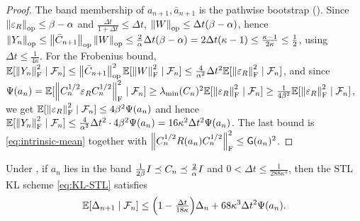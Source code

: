 \begin{proof}
The band membership of $a_{n+1},\bar a_{n+1}$ is the pathwise bootstrap
(). Since $\left\lVert \varepsilon_R\right\rVert_{\mathrm{op}}\leq\beta-\alpha$ and
$\tfrac{\Delta t}{1+\Delta t}\leq\Delta t$, $\left\lVert W\right\rVert_{\mathrm{op}}\leq\Delta t(\beta-\alpha)$, hence
$\left\lVert Y_n\right\rVert_{\mathrm{op}}\leq\left\lVert \bar C_{n+1}\right\rVert_{\mathrm{op}}\left\lVert W\right\rVert_{\mathrm{op}}\leq\tfrac2\alpha\Delta t(\beta-\alpha)=2\Delta t(\kappa-1)\leq\tfrac{\kappa-1}{2\kappa}\leq\tfrac12$,
using $\Delta t\leq\tfrac1{4\kappa}$. For the Frobenius bound,
$\mathbb{E}[\left\lVert Y_n\right\rVert_{\mathrm{F}}^2\mid\mathcal{F}_n]\leq\left\lVert \bar C_{n+1}\right\rVert_{\mathrm{op}}^2\mathbb{E}[\left\lVert W\right\rVert_{\mathrm{F}}^2\mid\mathcal{F}_n]\leq\tfrac4{\alpha^2}\Delta t^2\mathbb{E}[\left\lVert \varepsilon_R\right\rVert_{\mathrm{F}}^2\mid\mathcal{F}_n]$,
and since $\Psi(a_n)=\mathbb{E}[\left\lVert C_n^{1/2}\varepsilon_RC_n^{1/2}\right\rVert_{\mathrm{F}}^2\mid\mathcal{F}_n]\geq\lambda_{\min}(C_n)^2\mathbb{E}[\left\lVert \varepsilon_R\right\rVert_{\mathrm{F}}^2\mid\mathcal{F}_n]\geq\tfrac1{4\beta^2}\mathbb{E}[\left\lVert \varepsilon_R\right\rVert_{\mathrm{F}}^2\mid\mathcal{F}_n]$,
we get $\mathbb{E}[\left\lVert \varepsilon_R\right\rVert_{\mathrm{F}}^2\mid\mathcal{F}_n]\leq4\beta^2\Psi(a_n)$ and hence
$\mathbb{E}[\left\lVert Y_n\right\rVert_{\mathrm{F}}^2\mid\mathcal{F}_n]\leq\tfrac4{\alpha^2}\Delta t^2\cdot4\beta^2\Psi(a_n)=16\kappa^2\Delta t^2\Psi(a_n)$.
The last bound is \eqref{eq:intrinsic-mean} together with
$\left\lVert C_n^{1/2}R(a_n)C_n^{1/2}\right\rVert_{\mathrm{F}}^2\leq\mathsf{G}(a_n)^2$.
\end{proof}

\begin{lemma}
\label{lem:KL-STL-descent}
Under , if $a_n$ lies in the band
$\tfrac1{2\beta}I\preceq C_n\preceq\tfrac2\alpha I$ and
$0<\Delta t\leq\frac1{288\kappa^3}$,
then the STL KL scheme \eqref{eq:KL-STL} satisfies
\[
    \mathbb{E}[\Delta_{n+1}\mid\mathcal{F}_n]
    \leq
    \Bigl(1-\tfrac{\Delta t}{18\kappa}\Bigr)\Delta_n
    +
    68\kappa^3\Delta t^2\Psi(a_n).
\]
\end{lemma}

